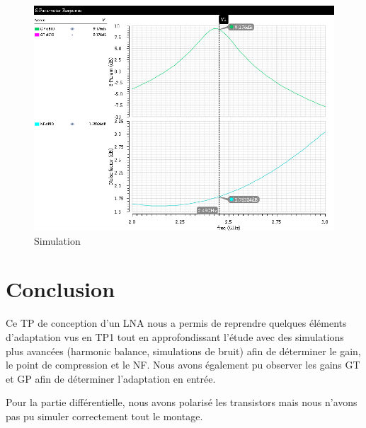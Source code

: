 \documentclass[a4paper]{article}
\begin{document}
\begin{figure}[!htb]
\begin{center}
  \includegraphics[scale=0.45]{Q6c-GTGP-NFdB10.png}
  \caption{Simulation }
  \label{facteur-bruit}
\end{center}
\end{figure}


\clearpage
\section*{Conclusion}


Ce TP de conception d'un LNA nous a permis de reprendre quelques \'el\'ements d'adaptation vus en TP1 tout en approfondissant l'\'etude avec
 des simulations plus avanc\'ees (harmonic balance, simulations de bruit) afin de d\'eterminer le gain, le point de compression et le NF.
 Nous avons \'egalement pu observer les gains GT et GP afin de d\'eterminer l'adaptation en entr\'ee.
 
Pour la partie diff\'erentielle, nous avons polaris\'e les transistors mais nous n'avons pas pu simuler correctement tout le montage.
\end{document}

